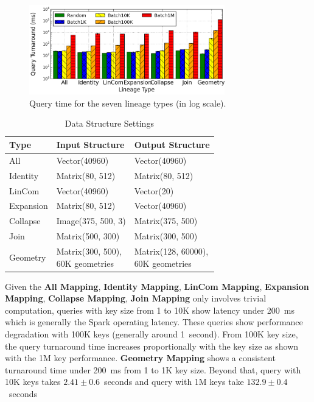 \documentclass{sig-alternate}
\begin{document}
\begin{figure}[t]
\begin{center}
    \includegraphics[width=85mm]{pictures/TypeQuery-Time}
\caption {Query time for the seven lineage types (in log scale).
    \label{fig:typequery}
}
\end{center}
\end{figure}

\begin{table}[t]
\begin{center}
    \caption{Data Structure Settings}
    \begin{scriptsize}
    \begin{tabular}{ | p{1.5cm} | p{3cm} | p{3cm} |}
    \hline
    Type & Input Structure & Output Structure \\ \hline \hline
    All & Vector(40960) & Vector(40960) \\ \hline
    Identity & Matrix(80, 512) & Matrix(80, 512) \\ \hline
    LinCom & Vector(40960) & Vector(20) \\ \hline
    Expansion & Matrix(80, 512) & Vector(40960) \\ \hline
    Collapse & Image(375, 500, 3) & Matrix(375, 500) \\ \hline
    Join & Matrix(500, 300) & Matrix(300, 500) \\ \hline
    Geometry& \shortstack[l]{Matrix(300, 500), \\60K geometries} &  \shortstack[l]{Matrix(128, 60000), \\60K geometries} \\ \hline
    \end{tabular}
    \end{scriptsize}
    \label{tb:typequery-stats}
\end{center}   
\end{table}

Given the {\bf All Mapping}, {\bf Identity Mapping}, {\bf LinCom Mapping}, {\bf Expansion Mapping}, {\bf Collapse Mapping}, {\bf Join Mapping}
only involves trivial computation, queries with key size from 1 to 10K show latency under 200~ms which is generally the Spark operating latency. 
These queries show performance degradation with 100K keys (generally around 1~second). 
From 100K key size, the query turnaround time increases proportionally with the key size as shown with the 1M key performance.
{\bf Geometry Mapping} shows a consistent turnaround time under 200~ms from 1 to 1K key size. 
Beyond that, query with 10K keys takes $2.41\pm0.6$~seconds and query with 1M keys take $132.9\pm0.4$~seconds
\end{document}
